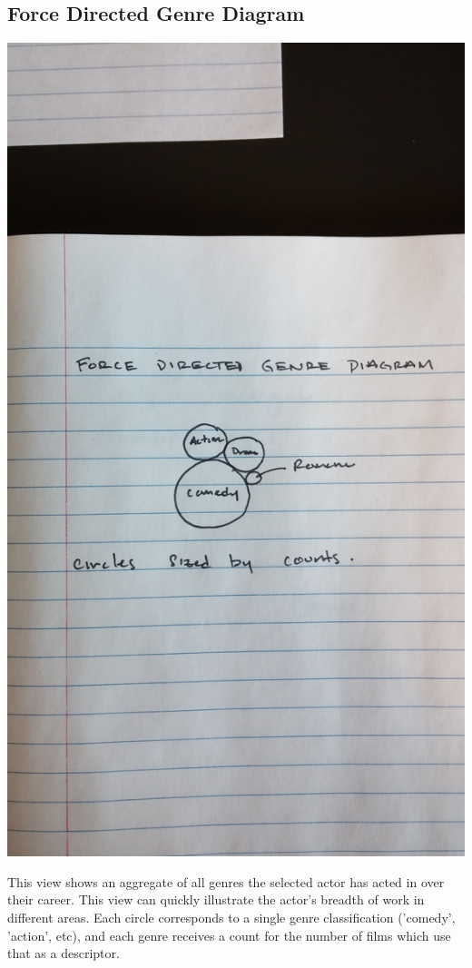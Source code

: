 \documentclass[12pt]{article}
\begin{document}
\subsection{Force Directed Genre Diagram}
\begin{center}
 \includegraphics[angle=-90, scale=0.05]{force.jpg}
\end{center}
 This view shows an aggregate of all genres the selected actor has acted in over their career.  This view can quickly illustrate the actor's breadth of work in different areas.  Each circle corresponds to a single genre classification ('comedy', 'action', etc), and each genre receives a count for the number of films which use that as a descriptor. 
 
\end{document}
